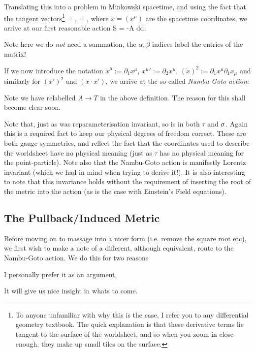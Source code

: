 Translating this into a problem in Minkowski spacetime, and using the fact that the tangent vectors\footnote{To anyone unfamiliar with why this is the case, I refer you to any differential geometry textbook. The quick explanation is that these derivative terms lie tangent to the surface of the worldsheet, and so when you zoom in close enough, they make up small tiles on the surface.}
\bse 
     = , \qquad {} \qquad {} = ,
\ese 
where $x=(x^{\mu})$ are the spacetime coordinates, we arrive at our first reasonable action 
\be 
\label{eqn:StringActionDet}
    S = -A \int d\sig d\tau {}.
\ee 

\br 
Note here we do \textit{not} need a summation, the $\alpha,\beta$ indices label the entries of the matrix!
\er 

If we now introduce the notation $\dot{x}^{\mu} := \partial_1x^{\mu}$, ${x^{\mu}}' := \partial_2x^{\mu}$, $(\dot{x})^2 := \partial_1x^{\mu}\partial_1x_{\mu}$ and similarly for $(x')^2$ and $(\dot{x}\cdot x')$, we arrive at the so-called \textit{Nambu-Goto action}:


\br 
Note we have relabelled $A\to T$ in the above definition. The reason for this shall become clear soon.
\er 

\br 
Note that, just as  was reparameterisation invariant, so is  in both $\tau$ and $\sigma$. Again this is a required fact to keep our physical degrees of freedom correct. These are both gauge symmetries, and reflect the fact that the coordinates used to describe the worldsheet have no physical meaning (just as $\tau$ has no physical meaning for the point-particle). Note also that the Nambu-Goto action is manifestly Lorentz invariant (which we had in mind when trying to derive it!). It is also interesting to note that this invariance holds without the requirement of inserting the root of the metric into the action (as is the case with Einstein's Field equations).
\er 

\subsection{The Pullback/Induced Metric}

Before moving on to massage  into a nicer form (i.e. remove the square root etc), we first wish to make a note of a different, although equivalent, route to the Nambu-Goto action. We do this for two reasons
\ben 
    \item I personally prefer it as an argument,
    \item It will give us nice insight in whats to come. 
\een 


